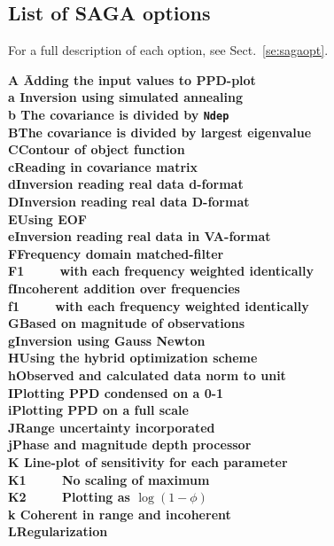 \subsection{List of SAGA options}
For a full description of each option, see Sect.~\ref{se:sagaopt}.
\begin{tabbing}
\bf A \hspace{.4in}\=Adding the input values to PPD-plot\\ 
\bf a \>Inversion using simulated annealing\\
\bf b \>The covariance is divided by {\tt Ndep}\\
\bf B\>The covariance is divided by largest eigenvalue\\
\bf C\>Contour of object function\\
\bf c\>Reading in covariance matrix\\
\bf d\>Inversion reading real data d-format\\
\bf D\>Inversion reading real data D-format\\
\bf E\>Using EOF\\
\bf e\>Inversion reading real data in VA-format  \\
\bf F\>Frequency domain matched-filter\\
\bf F1\>~~~~~with each frequency weighted identically\\
\bf f\>Incoherent addition over frequencies\\
\bf f1\>~~~~~with each frequency weighted identically\\
\bf G\>Based on magnitude of observations\\
\bf g\>Inversion using Gauss Newton\\
\bf H\>Using the hybrid optimization scheme\\
\bf h\>Observed and calculated data norm to unit\\
\bf I\>Plotting PPD condensed on a 0-1\\
\bf i\>Plotting PPD  on a full scale \\ 
\bf J\>Range uncertainty incorporated\\ 
\bf j\>Phase and magnitude depth processor\\
\bf K\> Line-plot of sensitivity for each parameter\\
\bf K1\>~~~~~No scaling of maximum \\
\bf K2\>~~~~~Plotting as $\log(1-\phi)$ \\
\bf k \>Coherent in range and incoherent\\
\bf L\>Regularization\\

\end{tabbing}
